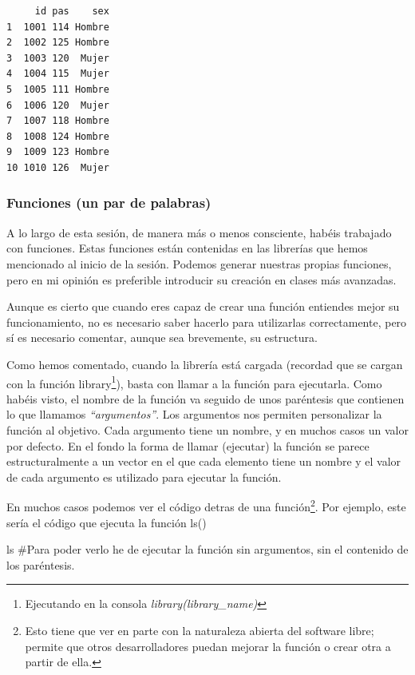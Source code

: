 \documentclass[
  letterpaper,
  DIV=11,
  numbers=noendperiod]{scrreprt}
\newenvironment{Shaded}{\begin{snugshade}}{\end{snugshade}}
\newcommand{\CommentTok}[1]{\textcolor[rgb]{0.37,0.37,0.37}{#1}}
\newcommand{\NormalTok}[1]{\textcolor[rgb]{0.00,0.23,0.31}{#1}}
\begin{document}
\begin{verbatim}
     id pas    sex
1  1001 114 Hombre
2  1002 125 Hombre
3  1003 120  Mujer
4  1004 115  Mujer
5  1005 111 Hombre
6  1006 120  Mujer
7  1007 118 Hombre
8  1008 124 Hombre
9  1009 123 Hombre
10 1010 126  Mujer
\end{verbatim}

\hypertarget{funciones-un-par-de-palabras}{%
\subsubsection{Funciones (un par de
palabras)}\label{funciones-un-par-de-palabras}}

A lo largo de esta sesión, de manera más o menos consciente, habéis
trabajado con funciones. Estas funciones están contenidas en las
librerías que hemos mencionado al inicio de la sesión. Podemos generar
nuestras propias funciones, pero en mi opinión es preferible introducir
su creación en clases más avanzadas.

Aunque es cierto que cuando eres capaz de crear una función entiendes
mejor su funcionamiento, no es necesario saber hacerlo para utilizarlas
correctamente, pero sí es necesario comentar, aunque sea brevemente, su
estructura.

Como hemos comentado, cuando la librería está cargada (recordad que se
cargan con la función library\footnote{Ejecutando en la consola
  \emph{library(library\_name)}}), basta con llamar a la función para
ejecutarla. Como habéis visto, el nombre de la función va seguido de
unos paréntesis que contienen lo que llamamos \emph{``argumentos''}. Los
argumentos nos permiten personalizar la función al objetivo. Cada
argumento tiene un nombre, y en muchos casos un valor por defecto. En el
fondo la forma de llamar (ejecutar) la función se parece
estructuralmente a un vector en el que cada elemento tiene un nombre y
el valor de cada argumento es utilizado para ejecutar la función.

En muchos casos podemos ver el código detras de una función\footnote{Esto
  tiene que ver en parte con la naturaleza abierta del software libre;
  permite que otros desarrolladores puedan mejorar la función o crear
  otra a partir de ella.}. Por ejemplo, este sería el código que ejecuta
la función ls()

\begin{Shaded}
\begin{Highlighting}[]
\NormalTok{ls }\CommentTok{\#Para poder verlo he de ejecutar la función sin argumentos, sin el contenido de los paréntesis.}
\end{Highlighting}
\end{Shaded}
\end{document}
